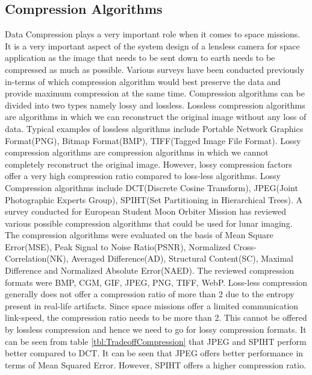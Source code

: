 \subsection{Compression Algorithms}
Data Compression plays a very important role when it comes to space missions. It is a very important aspect of the system design of a lensless camera for space application as the image that needs to be sent down to earth needs to be compressed as much as possible. Various surveys\cite{Compression2}\cite{Compression3}\cite{Compression4} have been conducted previously in-terms of which compression algorithm would best preserve the data and provide maximum compression at the same time. Compression algorithms can be divided into two types namely lossy and lossless. Lossless compression algorithms are algorithms in which we can reconstruct the original image without any loss of data. Typical examples of lossless algorithms include Portable Network Graphics Format(PNG), Bitmap Format(BMP), TIFF(Tagged Image File Format). Lossy compression algorithms are compression algorithms in which we cannot completely reconstruct the original image. However, lossy compression factors offer a very high compression ratio compared to loss-less algorithms. Lossy Compression algorithms include DCT(Discrete Cosine Transform), JPEG(Joint Photographic Experts Group), SPIHT(Set Partitioning in Hierarchical Trees)\cite{Compression3}. A survey conducted for European Student Moon Orbiter Mission\cite{Compression3} has reviewed various possible compression algorithms that could be used for lunar imaging. The compression algorithms were evaluated on the basis of Mean Square Error(MSE), Peak Signal to Noise Ratio(PSNR), Normalized Cross-Correlation(NK), Averaged Difference(AD), Structural Content(SC), Maximal Difference and Normalized Absolute Error(NAED). The reviewed compression formats were BMP, CGM, GIF, JPEG, PNG, TIFF, WebP. Loss-less compression generally does not offer a compression ratio of more than 2 due to the entropy present in real-life artifacts. Since space missions offer a limited communication link-speed, the compression ratio needs to be more than 2. This cannot be offered by lossless compression and hence we need to go for lossy compression formats. It can be seen from table \ref{tbl:TradeoffCompression} that JPEG and SPIHT perform better compared to DCT. It can be seen that JPEG offers better performance in terms of Mean Squared Error. However, SPIHT offers a higher compression ratio. 

